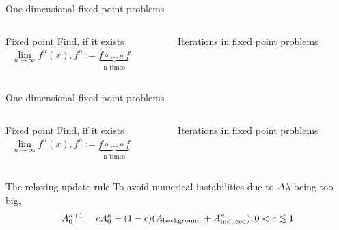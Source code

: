 \begin{frame}{One dimensional fixed point problems}
	\begin{columns}
	    \begin{column}{0.5\textwidth}
		    \begin{themedTitleBlock}{Fixed point}
			    Find, if it exists 
			    \begin{align*}
				    \lim_{n \to \infty} f^{n}(x), f^{n}:= \underbrace{f \circ\ldots \circ f}_\text{n times} 
			    \end{align*}
	    \end{themedTitleBlock}
	    \end{column}
	    
	    \begin{column}{0.5\textwidth}
\begin{figure}[ht]
    \centering
    \caption{Iterations in fixed point problems}
    \label{fig:iterations-in-fixed-point-problems}
\end{figure}
	    
	   \end{column}
	   \end{columns}
   \end{frame}
\begin{frame}{One dimensional fixed point problems}
	\begin{columns}
	    \begin{column}{0.5\textwidth}
		    \begin{themedTitleBlock}{Fixed point}
			    Find, if it exists 
			    \begin{align*}
				    \lim_{n \to \infty} f^{n}(x), f^{n}:= \underbrace{f \circ\ldots \circ f}_\text{n times} 
			    \end{align*}
	    \end{themedTitleBlock}
	    \end{column}
	    
	    \begin{column}{0.5\textwidth}
\begin{figure}[ht]
    \centering
    \caption{Iterations in fixed point problems}
    \label{fig:iterations-in-fixed-point-problems}
\end{figure}
	    
	   \end{column}
	   \end{columns}
   \end{frame}
\begin{frame}{The relaxing update rule}
To avoid numerical instabilities due to $\Delta \lambda$ being too big,  
\begin{align*}
	A_0^{\kappa+1} = c A_0^\kappa + (1-c)(A_\text{background}  + A^{\kappa}_\text{induced}), \hfill 0 < c \lesssim  1
\end{align*}
\end{frame}

